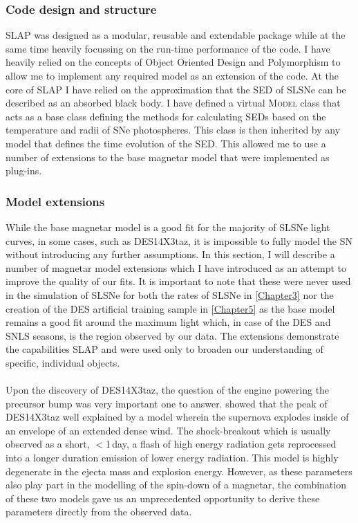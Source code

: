 \subsubsection{Code design and structure}
SLAP was designed as a modular, reusable and extendable package while at the same time heavily focussing on the run-time performance of the code. I have heavily relied on the concepts of Object Oriented Design and Polymorphism to allow me to implement any required model as an extension of the code. At the core of \textsc{SLAP} I have relied on the approximation that the SED of SLSNe can be described as an absorbed black body. I have defined a virtual \textsc{Model} class that acts as a base class defining the methods for calculating SEDs based on the temperature and radii of SNe photospheres. This class is then inherited by any model that defines the time evolution of the SED. This allowed me to use a number of extensions to the base magnetar model that were implemented as plug-ins.

\subsubsection{Model extensions}
While the base magnetar model is a good fit for the majority of SLSNe light curves, in some cases, such as DES14X3taz, it is impossible to fully model the SN without introducing any further assumptions. In this section, I will describe a number of magnetar model extensions which I have introduced as an attempt to improve the quality of our fits. It is important to note that these were never used in the simulation of SLSNe for both the rates of SLSNe in \cref{Chapter3} nor the creation of the DES artificial training sample in \cref{Chapter5} as the base model remains a good fit around the maximum light which, in case of the DES and SNLS seasons, is the region observed by our data. The extensions demonstrate the capabilities \textsc{SLAP} and were used only to broaden our understanding of specific, individual objects.

\paragraph{\citet{Piro2015}}
Upon the discovery of DES14X3taz, the question of the engine powering the precursor bump was very important one to answer. \citet{Smith2016} showed that the peak of DES14X3taz well explained by a model wherein the supernova explodes inside of an envelope of an extended dense wind. The shock-breakout which is usually observed as a short, $<$1\,day, a flash of high energy radiation gets reprocessed into a longer duration emission of lower energy radiation. This model is highly degenerate in the ejecta mass and explosion energy. However, as these parameters also play part in the modelling of the spin-down of a magnetar, the combination of these two models gave us an unprecedented opportunity to derive these parameters directly from the observed data.

